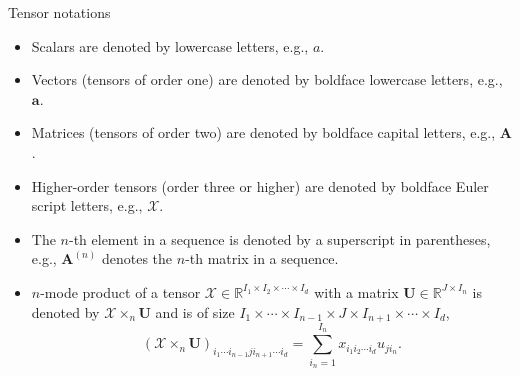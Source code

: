\documentclass[t, 10pt, handout, aspectratio=169]{beamer}
\begin{document}
\begin{frame}{Tensor notations}
\begin{itemize}
\item Scalars are denoted by lowercase letters, e.g., $a$.
\item Vectors (tensors of order one) are denoted by boldface lowercase letters, e.g., $\mathbf{a}$.
\item Matrices (tensors of order two) are denoted by boldface capital letters, e.g., $\mathbf{A}$.
\item Higher-order tensors (order three or higher) are denoted by boldface Euler script letters, e.g., $\mathcal{X}$.
\item  The $n$-th element in a sequence is denoted by a superscript in parentheses, e.g., $\mathbf{A}^{(n)}$ denotes the $n$-th matrix in a sequence.
\item $n$-mode product of a tensor $\mathcal{X}\in\mathbb{R}^{I_1 \times I_2 \times\cdots\times I_d}$ with a matrix $\mathbf{U}\in\mathbb{R}^{J\times I_n}$ is denoted by $\mathcal{X}\times_n \mathbf{U}$ and is of size $I_1 \times \cdots \times I_{n-1} \times J \times I_{n+1} \times \cdots \times I_d$,
$$
(\mathcal{X}\times_n\mathbf{U})_{i_1\cdots i_{n-1}ji_{n+1}\cdots i_d}=\sum_{i_n=1}^{I_n}x_{i_1i_2\cdots i_d}u_{ji_n}.
$$
\end{itemize}
\end{frame}
\end{document}
